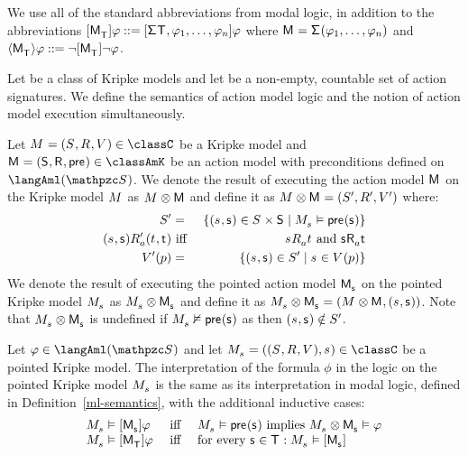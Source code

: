 We use all of the standard abbreviations from modal logic, in addition to the abbreviations 
$\actionA{\aPModel{\aStatesT}} \phi ::= \actionA{\aSignature \aStatesT, \phi_1, \dots, \phi_n} \phi$ where $\aModel = \aSignature(\phi_1, \dots, \phi_n)$ and 
$\actionE{\aPModel{\aStatesT}} \phi ::= \lnot \actionA{\aPModel{\aStatesT}} \lnot \phi$.

\begin{definition}
Let \classC{} be a class of Kripke models and let \aSignatureFamily{} be a non-empty, countable set of action signatures.
We define the semantics of action model logic and the notion of action model execution simultaneously.

Let $\kModelAndTuple \in \classC$ be a Kripke model and $\aModelAndTuple \in \classAmK$ be an action model with preconditions defined on $\langAml(\aSignatureFamily)$.
We denote the result of executing the action model $\aModel$ on the Kripke model $\kModel$ as $\kModel \exec \aModel$ and define it as $\kModel \exec \aModel = \kModelTupleP$ where:
\begin{eqnarray*}
    \kStatesP &=& \{(\kStateS, \aStateS) \in \kStates \times \aStates \mid \kPModel{\kStateS} \entails \aPrecondition(\aStateS)\}\\
    (\kStateS, \aStateS) \kAccessibilityPA (\kStateT, \aStateT) &\text{ iff }& \kStateS \kAccessibilityA \kStateT \text{ and } \aStateS \aAccessibilityA \aStateT\\
    \kValuationP(\atomP) &=& \{(\kStateS, \aStateS) \in \kStatesP \mid \kStateS \in \kValuation(\atomP)\}
\end{eqnarray*}
We denote the result of executing the pointed action model $\aPModel{\aStateS}$ on the pointed Kripke model $\kPModel{\kStateS}$ as $\kPModel{\kStateS} \exec \aPModel{\aStateS}$ and define it as $\kPModel{\kStateS} \exec \aPModel{\aStateS} = (\kModel \exec \aModel, (\kStateS, \aStateS))$. Note that $\kPModel{\kStateS} \exec \aPModel{\aStateS}$ is undefined if $\kPModel{\kStateS} \nentails \aPrecondition(\aStateS)$ as then $(\kStateS, \aStateS) \notin \kStatesP$.

Let $\phi \in \langAml(\aSignatureFamily)$ and let $\kPModelAndTuple{\kStateS} \in \classC$ be a pointed Kripke model.
The interpretation of the formula $\phi$ in the logic \logicAmlC{} on the pointed Kripke model $\kPModel{\kStateS}$ is the same as its interpretation in modal logic, defined in Definition~\ref{ml-semantics}, with the additional inductive cases:
$$
\begin{array}{lcl}
    \kPModel{\kStateS} \entails \actionA{\aPModel{\aStateS}} \phi & \text { iff } & \kPModel{\kStateS} \entails \aPrecondition(\aStateS) \text{ implies } \kPModel{\kStateS} \exec \aPModel{\aStateS} \entails \phi\\
    \kPModel{\kStateS} \entails \actionA{\aPModel{\aStatesT}} \phi & \text { iff } & \text{for every } \aStateS \in \aStatesT: \kPModel{\kStateS} \entails \actionA{\aPModel{\aStateS}}
\end{array}
$$
\end{definition}

